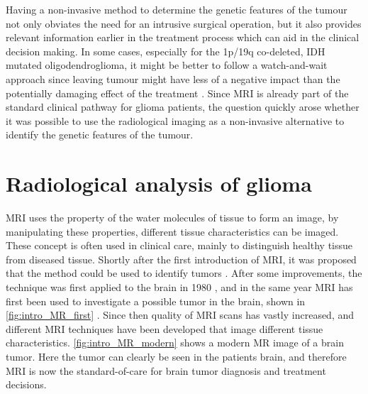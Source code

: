 Having a non-invasive method to determine the genetic features of the tumour not only obviates the need for an intrusive surgical operation, but it also provides relevant information earlier in the treatment process which can aid in the clinical decision making.
In some cases, especially for the 1p/19q co-deleted, IDH mutated oligodendroglioma, it might be better to follow a watch-and-wait approach since leaving tumour might have less of a negative impact than the potentially damaging effect of the treatment \autocite{vandenbent2012lggtreatment, welle2017EANO}.
Since \gls{MRI} is already part of the standard clinical pathway for glioma patients, the question quickly arose whether it was possible to use the radiological imaging as a non-invasive alternative to identify the genetic features of the tumour.

\section{Radiological analysis of glioma}
\gls{MRI} uses the property of the water molecules of tissue to form an image, by manipulating these properties, different tissue characteristics can be imaged.
These concept is often used in clinical care, mainly to distinguish healthy tissue from diseased tissue.
Shortly after the first introduction of \gls{MRI}, it was proposed that the method could be used to identify tumors \autocite{damadian1971tumor}.
After some improvements, the technique was first applied to the brain in 1980 \autocite{holland1980brain}, and in the same year MRI has first been used to investigate a possible tumor in the brain, shown in \cref{fig:intro_MR_first} \autocite{hawkes1980NMRbrain}.
Since then quality of \gls{MRI} scans has vastly increased, and different \gls{MRI} techniques have been developed that image different tissue characteristics.
\cref{fig:intro_MR_modern} shows a modern \gls{MR} image of a brain tumor.
Here the tumor can clearly be seen in the patients brain, and therefore \gls{MRI} is now the standard-of-care for brain tumor diagnosis and treatment decisions.


